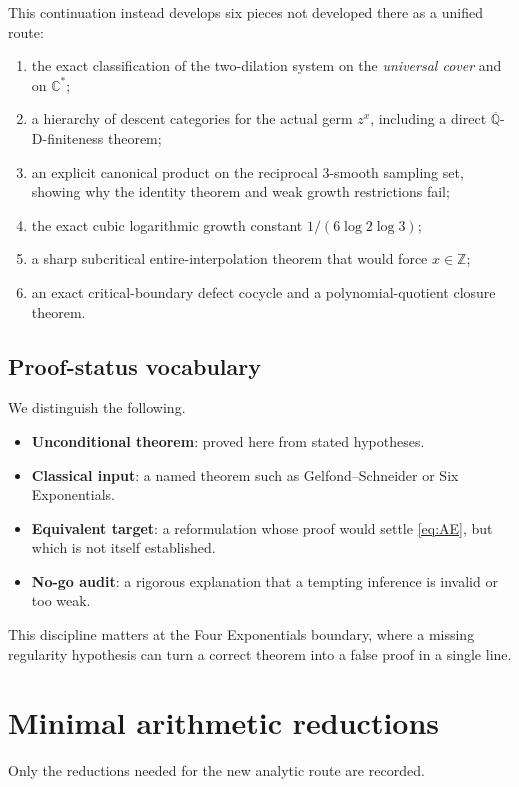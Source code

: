 \documentclass[11pt,oneside]{article}
\theoremstyle{definition}
\theoremstyle{remark}
\newcommand{\Z}{\mathbb Z}
\newcommand{\C}{\mathbb C}
\newcommand{\Qbar}{\overline{\mathbb Q}}
\begin{document}
This continuation instead develops six pieces not developed there as a unified route:
\begin{enumerate}[label=\textbf{N\arabic*.}]
\item the exact classification of the two-dilation system on the \emph{universal cover} and on \(\C^*\);
\item a hierarchy of descent categories for the actual germ \(z^x\), including a direct \(\Qbar\)-D-finiteness theorem;
\item an explicit canonical product on the reciprocal \(3\)-smooth sampling set, showing why the identity theorem and weak growth restrictions fail;
\item the exact cubic logarithmic growth constant \(1/(6\log2\log3)\);
\item a sharp subcritical entire-interpolation theorem that would force \(x\in\Z\);
\item an exact critical-boundary defect cocycle and a polynomial-quotient closure theorem.
\end{enumerate}

\subsection{Proof-status vocabulary}

We distinguish the following.
\begin{itemize}
\item \textbf{Unconditional theorem}: proved here from stated hypotheses.
\item \textbf{Classical input}: a named theorem such as Gelfond--Schneider or Six Exponentials.
\item \textbf{Equivalent target}: a reformulation whose proof would settle \eqref{eq:AE}, but which is not itself established.
\item \textbf{No-go audit}: a rigorous explanation that a tempting inference is invalid or too weak.
\end{itemize}
This discipline matters at the Four Exponentials boundary, where a missing regularity hypothesis can turn a correct theorem into a false proof in a single line.

\section{Minimal arithmetic reductions}

Only the reductions needed for the new analytic route are recorded.
\end{document}
